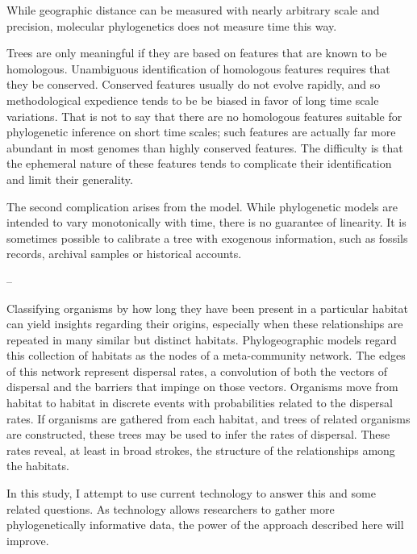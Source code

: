While geographic distance can be measured with nearly arbitrary scale and precision, molecular phylogenetics does not measure time this way.

Trees are only meaningful if they are based on features that are known to be homologous. Unambiguous identification of homologous features requires that they be conserved. Conserved features usually do not evolve rapidly, and so methodological expedience tends to be be biased in favor of long time scale variations. That is not to say that there are no homologous features suitable for phylogenetic inference on short time scales; such features are actually far more abundant in most genomes than highly conserved features. The difficulty is that the ephemeral nature of these features tends to complicate their identification and limit their generality.

The second complication arises from the model. While phylogenetic models are intended to vary monotonically with time, there is no guarantee of linearity. It is sometimes possible to calibrate a tree with exogenous information, such as fossils records, archival samples or historical accounts. 

--

Classifying organisms by how long they have been present in a particular habitat can yield insights regarding their origins, especially when these relationships are repeated in many similar but distinct habitats. Phylogeographic models regard this collection of habitats as the nodes of a meta-community network. The edges of this network represent dispersal rates, a convolution of both the vectors of dispersal and the barriers that impinge on those vectors. Organisms move from habitat to habitat in discrete events with probabilities related to the dispersal rates. If organisms are gathered from each habitat, and trees of related organisms are constructed, these trees may be used to infer the rates of dispersal. These rates reveal, at least in broad strokes, the structure of the relationships among the habitats.



In this study, I attempt to use current technology to answer this and some related questions. As technology allows researchers to gather more phylogenetically informative data, the power of the approach described here will improve. 

